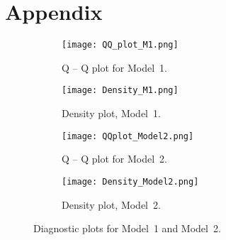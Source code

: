 \documentclass[review]{elsarticle}
\begin{document}
\section{Appendix}
\label{Appnd}

\begin{figure*}[!ht]
\centering
\begin{subfigure}{.40\textwidth}
  \centering
  \texttt{[image: QQ\_plot\_M1.png]}
  \caption{Q -- Q plot for Model~1.}
  \label{fig:qq}
\end{subfigure}%
\begin{subfigure}{.40\textwidth}
  \centering
  \texttt{[image: Density\_M1.png]}
  \caption{Density plot, Model~1.}
  \label{fig:density}
\end{subfigure}

\begin{subfigure}{.40\textwidth}
  \centering
  \texttt{[image: QQplot\_Model2.png]}
  \caption{Q -- Q plot for Model~2.}
  \label{fig:qq2}
\end{subfigure}%
\begin{subfigure}{.40\textwidth}
  \centering
  \texttt{[image: Density\_Model2.png]}
  \caption{Density plot, Model~2.}
  \label{fig:density2}
\end{subfigure}
\caption{Diagnostic plots for Model~1 and Model~2.}
\label{fig:Diag_EVT}
\end{figure*}


\newpage
\clearpage
{}
%

\end{document}
